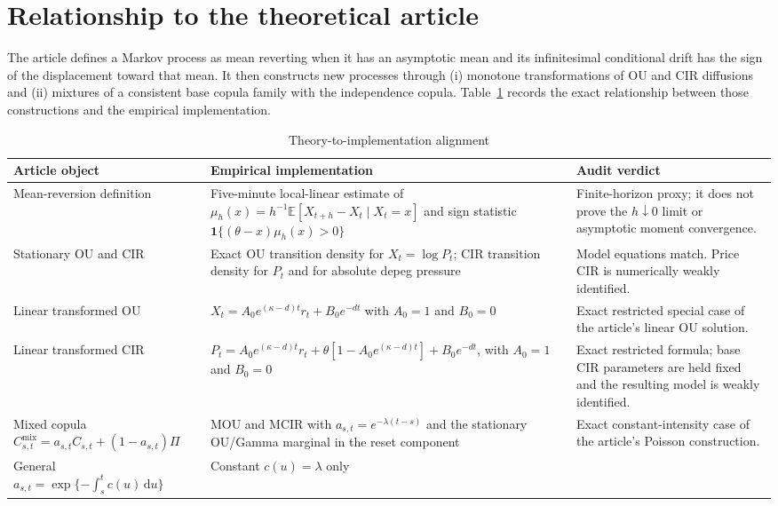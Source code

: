 \documentclass[11pt]{article}
\newcommand{\E}{\mathbb{E}}
\newcommand{\1}{\mathbf{1}}
\newcommand{\dd}{\,\mathrm{d}}
\begin{document}
\section{Relationship to the theoretical article}
\label{emp:sec:alignment}

The article defines a Markov process as mean reverting when it has an asymptotic
mean and its infinitesimal conditional drift has the sign of the displacement
toward that mean.  It then constructs new processes through (i) monotone
transformations of OU and CIR diffusions and (ii) mixtures of a consistent base
copula family with the independence copula.  Table~\ref{emp:tab:alignment}
records the exact relationship between those constructions and the empirical
implementation.

\begin{table}[htbp]
\centering
\caption{Theory-to-implementation alignment}
\label{emp:tab:alignment}
\begin{threeparttable}
\small
\begin{tabular}{p{}p{}p{}}
\toprule
Article object & Empirical implementation & Audit verdict \\
\midrule
Mean-reversion definition & Five-minute local-linear estimate of
$\mu_h(x)=h^{-1}\E[X_{t+h}-X_t\mid X_t=x]$ and sign statistic
$\1\{(\theta-x)\mu_h(x)>0\}$ & Finite-horizon proxy; it does not prove the
$h\downarrow0$ limit or asymptotic moment convergence. \\
Stationary OU and CIR & Exact OU transition density for $X_t=\log P_t$; CIR
transition density for $P_t$ and for absolute depeg pressure & Model equations
match.  Price CIR is numerically weakly identified. \\
Linear transformed OU &
$X_t=A_0e^{(\kappa-d)t}r_t+B_0e^{-dt}$ with $A_0=1$ and $B_0=0$ & Exact
restricted special case of the article's linear OU solution. \\
Linear transformed CIR &
$P_t=A_0e^{(\kappa-d)t}r_t+\theta[1-A_0e^{(\kappa-d)t}]+B_0e^{-dt}$,
with $A_0=1$ and $B_0=0$ & Exact restricted formula; base CIR parameters are
held fixed and the resulting model is weakly identified. \\
Mixed copula
$C^{\mathrm{mix}}_{s,t}=a_{s,t}C_{s,t}+(1-a_{s,t})\Pi$ & MOU and MCIR with
$a_{s,t}=e^{-\lambda(t-s)}$ and the stationary OU/Gamma marginal in the reset
component & Exact constant-intensity case of the article's Poisson construction. \\
General $a_{s,t}=\exp\{-\int_s^t c(u)\dd u\}$ & Constant $c(u)=\lambda$ only &

\end{tabular}
\end{threeparttable}
\end{table}
\end{document}
